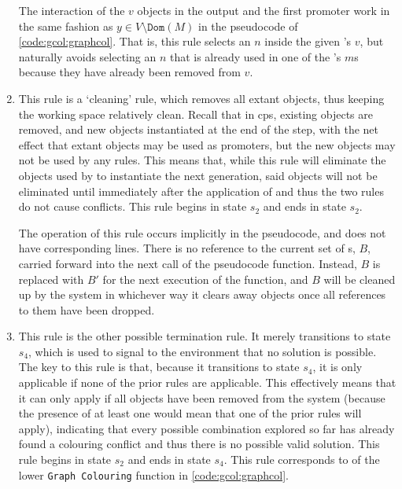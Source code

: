 \begin{enumerate}
The interaction of the \(v\) objects in the output and the first \gls{promoter} work in the same fashion as \(y \in V \setminus \texttt{Dom}(M)\) in the pseudocode of \cref{code:gcol:graphcol}.  That is, this rule selects an \(n\) inside the given \bo{}'s \(v\), but naturally avoids selecting an \(n\) that is already used in one of the \bo{}'s \(m\)s because they have already been removed from \(v\).

\item This rule is a `cleaning' rule, which removes all extant \bo{} objects, thus keeping the working space relatively clean.  Recall that in \gls{cps}, existing objects are removed, and new objects instantiated at the end of the step, with the net effect that extant objects may be used as \glspl{promoter}, but the new objects may not be used by any rules.  This means that, while this rule will eliminate the \bo{} objects used by  to instantiate the next generation, said objects will not be eliminated until immediately after the application of  and thus the two rules do not cause conflicts.  This rule begins in state \(s_2\) and ends in state \(s_2\).

The operation of this rule occurs implicitly in the pseudocode, and does not have corresponding lines.  There is no reference to the current set of \bo{}s, \(B\), carried forward into the next call of the pseudocode function.  Instead, \(B\) is replaced with \(B'\) for the next execution of the function, and \(B\) will be cleaned up by the system in whichever way it clears away objects once all references to them have been dropped.

\item This rule is the other possible termination rule.  It merely transitions to state \(s_4\), which is used to signal to the environment that no solution is possible.  The key to this rule is that, because it transitions to state \(s_4\), it is only applicable if none of the prior rules are applicable.  This effectively means that it can only apply if all \bo{} objects have been removed from the system (because the presence of at least one \bo{} would mean that one of the prior rules will apply), indicating that every possible combination explored so far has already found a colouring conflict and thus there is no possible valid solution.  This rule begins in state \(s_2\) and ends in state \(s_4\).  This rule corresponds to  of the lower \texttt{Graph Colouring} function in \cref{code:gcol:graphcol}.

\end{enumerate}

